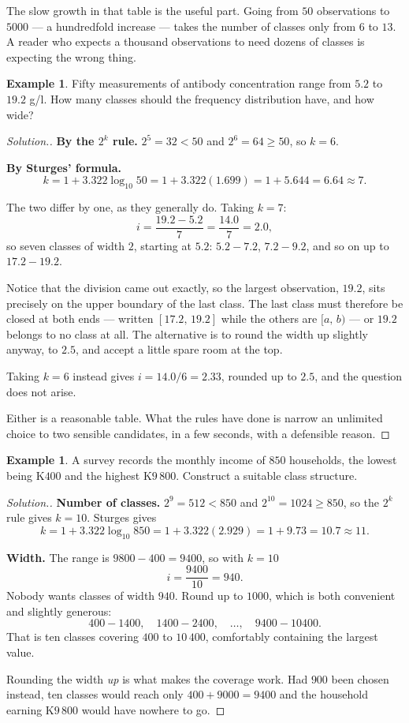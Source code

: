 \documentclass[11pt,a4paper]{article}
\theoremstyle{definition}
\newtheorem{example}[thm]{Example}
\newenvironment{solution}
  {\renewcommand{\qedsymbol}{}\begin{proof}[\textit{Solution}.]}
  {\end{proof}}
\begin{document}
The slow growth in that table is the useful part. Going from $50$ observations to $5000$ ---
a hundredfold increase --- takes the number of classes only from $6$ to $13$. A reader who
expects a thousand observations to need dozens of classes is expecting the wrong thing.

\begin{example}
Fifty measurements of antibody concentration range from $5.2$ to $19.2$ g/l. How many classes
should the frequency distribution have, and how wide?
\end{example}

\begin{solution}
\textbf{By the $2^k$ rule.} $2^5=32<50$ and $2^6=64\geq 50$, so $k=6$.

\textbf{By Sturges' formula.}
\[k=1+3.322\log_{10}50=1+3.322(1.699)=1+5.644=6.64\approx 7.\]

The two differ by one, as they generally do. Taking $k=7$:
\[i=\frac{19.2-5.2}{7}=\frac{14.0}{7}=2.0,\]
so seven classes of width $2$, starting at $5.2$: $5.2-7.2$, $7.2-9.2$, and so on up to
$17.2-19.2$.

Notice that the division came out exactly, so the largest observation, $19.2$, sits precisely
on the upper boundary of the last class. The last class must therefore be closed at both ends
--- written $[17.2,\,19.2]$ while the others are $[a,\,b)$ --- or $19.2$ belongs to no class
at all. The alternative is to round the width up slightly anyway, to $2.5$, and accept a
little spare room at the top.

Taking $k=6$ instead gives $i=14.0/6=2.33$, rounded up to $2.5$, and the question does not
arise.

Either is a reasonable table. What the rules have done is narrow an unlimited choice to two
sensible candidates, in a few seconds, with a defensible reason.
\end{solution}

\begin{example}
A survey records the monthly income of $850$ households, the lowest being K$400$ and the
highest K$9\,800$. Construct a suitable class structure.
\end{example}

\begin{solution}
\textbf{Number of classes.} $2^9=512<850$ and $2^{10}=1024\geq 850$, so the $2^k$ rule gives
$k=10$. Sturges gives
\[k=1+3.322\log_{10}850=1+3.322(2.929)=1+9.73=10.7\approx 11.\]

\textbf{Width.} The range is $9800-400=9400$, so with $k=10$
\[i=\frac{9400}{10}=940.\]
Nobody wants classes of width $940$. Round up to $1000$, which is both convenient and
slightly generous:
\[400-1400,\quad 1400-2400,\quad \ldots,\quad 9400-10400.\]
That is ten classes covering $400$ to $10\,400$, comfortably containing the largest value.

Rounding the width \emph{up} is what makes the coverage work. Had $900$ been chosen instead,
ten classes would reach only $400+9000=9400$ and the household earning K$9\,800$ would have
nowhere to go.
\end{solution}
\end{document}
